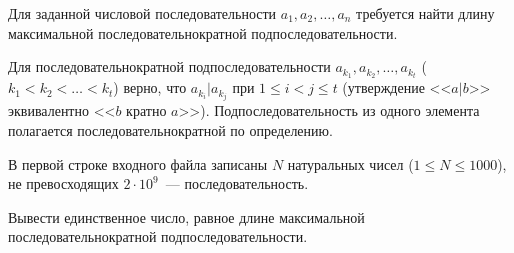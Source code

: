 

Для заданной числовой последовательности $a_1, a_2, \dots , a_n$ требуется найти длину максимальной последовательнократной подпоследовательности.

Для последовательнократной подпоследовательности $a_{k_1}, a_{k_2}, \dots, a_{k_t}$ ($k_1 < k_2 < \dots < k_t$) верно, что $a_{k_i} | a_{k_j}$ при $1 \leqslant i < j \leqslant t$ (утверждение <<$a|b$>> эквивалентно <<$b$ кратно $a$>>). Подпоследовательность из одного элемента полагается последовательнократной по определению.

\InputFile
В первой строке входного файла записаны $N$ натуральных чисел ($1 \leqslant N \leqslant 1000$), не превосходящих $2\cdot10^9$~--- последовательность.

\OutputFile
Вывести единственное число, равное длине максимальной последовательнократной подпоследовательности.

